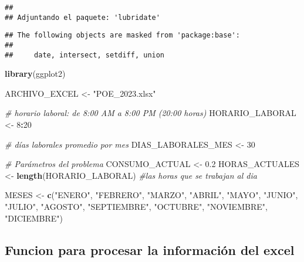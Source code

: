 \documentclass[
]{article}
\newenvironment{Shaded}{\begin{snugshade}}{\end{snugshade}}
\newcommand{\CommentTok}[1]{\textcolor[rgb]{0.56,0.35,0.01}{\textit{#1}}}
\newcommand{\DecValTok}[1]{\textcolor[rgb]{0.00,0.00,0.81}{#1}}
\newcommand{\FloatTok}[1]{\textcolor[rgb]{0.00,0.00,0.81}{#1}}
\newcommand{\FunctionTok}[1]{\textcolor[rgb]{0.13,0.29,0.53}{\textbf{#1}}}
\newcommand{\NormalTok}[1]{#1}
\newcommand{\OtherTok}[1]{\textcolor[rgb]{0.56,0.35,0.01}{#1}}
\newcommand{\SpecialCharTok}[1]{\textcolor[rgb]{0.81,0.36,0.00}{\textbf{#1}}}
\newcommand{\StringTok}[1]{\textcolor[rgb]{0.31,0.60,0.02}{#1}}
\begin{document}
\begin{verbatim}
## 
## Adjuntando el paquete: 'lubridate'
\end{verbatim}

\begin{verbatim}
## The following objects are masked from 'package:base':
## 
##     date, intersect, setdiff, union
\end{verbatim}

\begin{Shaded}
\begin{Highlighting}[]
\FunctionTok{library}\NormalTok{(ggplot2) }

\NormalTok{ARCHIVO\_EXCEL }\OtherTok{\textless{}{-}} \StringTok{"POE\_2023.xlsx"}

\CommentTok{\# horario laboral: de 8:00 AM a 8:00 PM (20:00 horas)}
\NormalTok{HORARIO\_LABORAL }\OtherTok{\textless{}{-}} \DecValTok{8}\SpecialCharTok{:}\DecValTok{20} 

\CommentTok{\# días laborales promedio por mes}
\NormalTok{DIAS\_LABORALES\_MES }\OtherTok{\textless{}{-}} \DecValTok{30}

\CommentTok{\# Parámetros del problema}
\NormalTok{CONSUMO\_ACTUAL }\OtherTok{\textless{}{-}} \FloatTok{0.2}
\NormalTok{HORAS\_ACTUALES }\OtherTok{\textless{}{-}} \FunctionTok{length}\NormalTok{(HORARIO\_LABORAL) }\CommentTok{\#las horas que se trabajan al dia}

\NormalTok{MESES }\OtherTok{\textless{}{-}} \FunctionTok{c}\NormalTok{(}\StringTok{"ENERO"}\NormalTok{, }\StringTok{"FEBRERO"}\NormalTok{, }\StringTok{"MARZO"}\NormalTok{, }\StringTok{"ABRIL"}\NormalTok{, }\StringTok{"MAYO"}\NormalTok{, }\StringTok{"JUNIO"}\NormalTok{,}
           \StringTok{"JULIO"}\NormalTok{, }\StringTok{"AGOSTO"}\NormalTok{, }\StringTok{"SEPTIEMBRE"}\NormalTok{, }\StringTok{"OCTUBRE"}\NormalTok{, }\StringTok{"NOVIEMBRE"}\NormalTok{, }\StringTok{"DICIEMBRE"}\NormalTok{)}
\end{Highlighting}
\end{Shaded}

\subsection{Funcion para procesar la información del
excel}\label{funcion-para-procesar-la-informaciuxf3n-del-excel}
\end{document}
